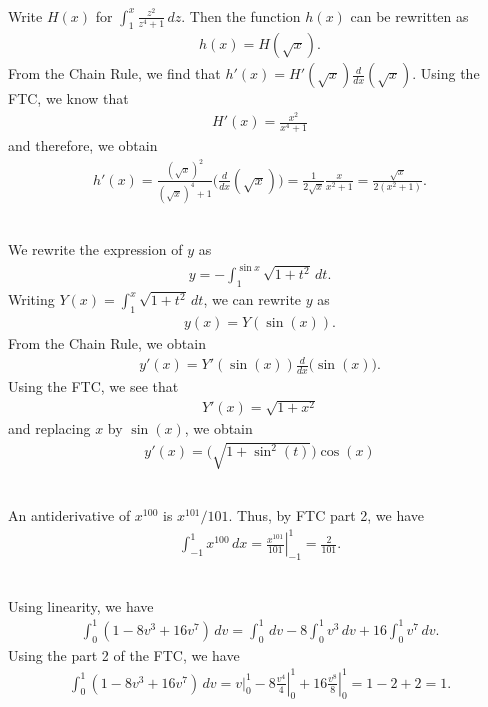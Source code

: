 	\spc
	
	\\
	Write $H(x)$ for $\displaystyle \int_1^x \frac{z^2}{z^4 + 1} \, dz$. Then the function $h(x)$ can be rewritten as
		\begin{align*}
		h(x) = H (\sqrt{x}) .
		\end{align*}
	From the Chain Rule, we find that $h' (x) = H'(\sqrt{x}) \frac{d}{dx} (\sqrt{x})$. Using the FTC, we know that 
		\begin{align*}
		H'(x) = \frac{x^2}{x^4 + 1}
		\end{align*}
	and therefore, we obtain
		\begin{align*}
		h'(x) = \frac{(\sqrt{x})^2}{(\sqrt{x})^4 + 1} \Big( \frac{d}{dx} (\sqrt{x}) \Big) = \frac{1}{2 \sqrt{x}} \frac{x}{x^2 + 1}  = \frac{\sqrt{x}}{2 (x^2 + 1)} .
		\end{align*}
		
	\spc
	
	\\
	We rewrite the expression of $y$ as
		\begin{align*}
		y = - \int_{1}^{\sin x} \sqrt{1 + t^2} \, dt .
		\end{align*}
	Writing $Y(x) = \displaystyle \int_1^x \sqrt{1 + t^2} \, dt$, we can rewrite $y$ as
		\begin{align*}
		y(x) = Y(\sin (x)) .
		\end{align*}
	From the Chain Rule, we obtain
		\begin{align*}
		y' (x) = Y'(\sin (x)) \frac{d}{dx} \big( \sin (x) \big) .
		\end{align*}
	Using the FTC, we see that
		\begin{align*}
		Y'(x) = \sqrt{1 + x^2}
		\end{align*}
	and replacing $x$ by $\sin (x)$, we obtain
		\begin{align*}
		y' (x) = \big( \sqrt{1 + \sin^2 (t)} \big) \cos (x)
		\end{align*}
		
	\spc
	
	\\
	An antiderivative of $x^{100}$ is $x^{101}/101$. Thus, by FTC part 2, we have
		\begin{align*}
		\int_{-1}^1 x^{100} \, dx = \left. \frac{x^{101}}{101} \right|_{-1}^1 = \frac{2}{101} .
		\end{align*}
	
	\spc
	
	\\
	Using linearity, we have
		\begin{align*}
		\int_0^1 (1 - 8v^3 + 16v^7 ) \, dv = \int_0^1 \, dv - 8 \int_0^1 v^3 \, dv + 16 \int_0^1 v^7 \, dv .
		\end{align*}
	Using the part 2 of the FTC, we have
		\begin{align*}
		\int_0^1 (1 - 8v^3 + 16v^7 ) \, dv = \left. v \right|_0^1 - 8 \left. \frac{v^4}{4} \right|_0^1 + 16 \left. \frac{v^8}{8} \right|_0^1 = 1 - 2 + 2 = 1 .
		\end{align*}
		
